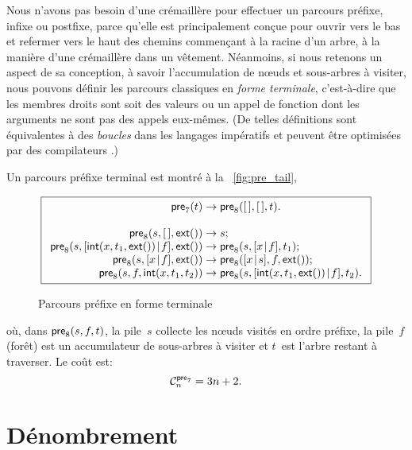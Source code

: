 Nous n'avons pas besoin d'une crémaillère pour effectuer un parcours préfixe, infixe ou
postfixe, parce qu'elle est principalement conçue pour ouvrir vers le
bas et refermer vers le haut des chemins commençant à la racine d'un
arbre, à la manière d'une crémaillère dans un vêtement. Néanmoins, si
nous retenons un aspect de sa conception, à savoir l'accumulation de
nœuds et sous-arbres à visiter, nous pouvons définir les parcours
classiques en \emph{forme terminale}, c'est-à-dire que les membres droits sont soit des
valeurs ou un appel de fonction dont les arguments ne sont pas des
appels eux-mêmes. (De telles définitions sont équivalentes à des
\emph{boucles} dans les langages impératifs et peuvent être optimisées
par des compilateurs \citep{Appel_1992}.)

Un parcours préfixe terminal est montré à la \fig~\vref{fig:pre_tail},
\begin{figure}[b]
\begin{equation*}
\boxed{
\begin{array}{r@{\;}c@{\;}l}
\fun{pre}_7(t) & \rightarrow & \fun{pre}_8(\el,\el,t).\\
\\
\fun{pre}_8(s,\el,\fun{ext}()) & \rightarrow & s;\\
\fun{pre}_8(s,\cons{\fun{int}(x,t_1,\fun{ext}())}{f},\fun{ext}()) &
\rightarrow & \fun{pre}_8(s,\cons{x}{f},t_1);\\
\fun{pre}_8(s,\cons{x}{f},\fun{ext}()) & \rightarrow &
\fun{pre}_8(\cons{x}{s},f,\fun{ext}());\\
\fun{pre}_8(s,f,\fun{int}(x,t_1,t_2)) & \rightarrow &
\fun{pre}_8(s,\cons{\fun{int}(x,t_1,\fun{ext}())}{f},t_2).
\end{array}}
\end{equation*}
\caption{Parcours préfixe en forme terminale}
\label{fig:pre_tail}
\end{figure}
où, dans \(\fun{pre}_8(s,f,t)\), la pile~\(s\) collecte les nœuds
visités en ordre préfixe, la pile~\(f\) (forêt) est un accumulateur de
sous-arbres à visiter et \(t\)~est l'arbre restant à traverser. Le
coût est:
\begin{equation*}
  \C{\fun{pre}_7}{n} = 3n + 2.
\end{equation*}

\section{Dénombrement}

